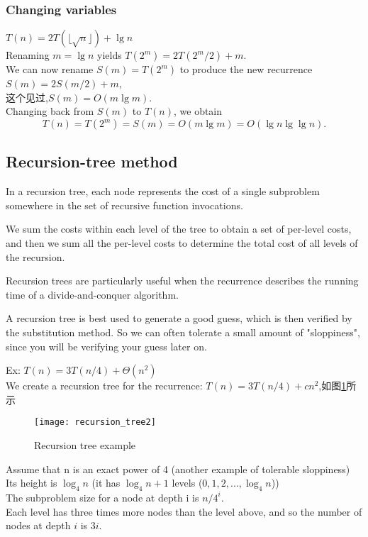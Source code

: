 \documentclass{article}
\begin{document}
\subsubsection{Changing variables}
$T(n) = 2T(\lfloor \sqrt{n} \rfloor) +\lg n$\\
Renaming $m = \lg n$ yields  $T(2^m) = 2T(2^m/2) + m$.\\
We can now rename $S(m) = T(2^m)$ to produce the new recurrence
$S(m) = 2S(m/2) + m$,\\
这个见过,$S(m) = O(m \lg m)$.\\
Changing back from $S(m)$ to $T(n)$, we obtain
$$
T(n) = T(2^m) = S(m) = O(m \lg m) = O(\lg n \lg \lg n).
$$

\subsection{Recursion-tree method}
In a recursion tree, each node represents the cost of a single subproblem somewhere in the set of recursive function invocations.

We sum the costs within each level of the tree to obtain a set of per-level costs, and then we sum all the per-level costs to
determine the total cost of all levels of the recursion.

Recursion trees are particularly useful when the recurrence describes the running time of a divide-and-conquer algorithm.

A recursion tree is best used to generate a good guess,
which is then verified by the substitution method. So we can often tolerate a small amount of "sloppiness", since you will be verifying your guess later on.

Ex:
$T(n) = 3T(n/4) + \Theta(n^2)$\\
We create a recursion tree for the recurrence: $T(n) = 3T(n/4) + cn^2$,如图\ref{fig.compute.recursion_tree2}所示
\begin{figure}[htbp]
  \centering
  \texttt{[image: recursion\_tree2]}\\
  \caption{Recursion tree example}\label{fig.compute.recursion_tree2}
\end{figure}

Assume that n is an exact power of 4 (another example of tolerable sloppiness)\\
Its height is $\log_4 n$ (it has $\log_4 n + 1$ levels ($0, 1, 2,..., \log_4 n$))\\
The subproblem size for a node at depth i is $n/4^i$.\\
Each level has three times more nodes than the level above, and so the number of nodes at depth $i$ is $3i$.
\end{document}
